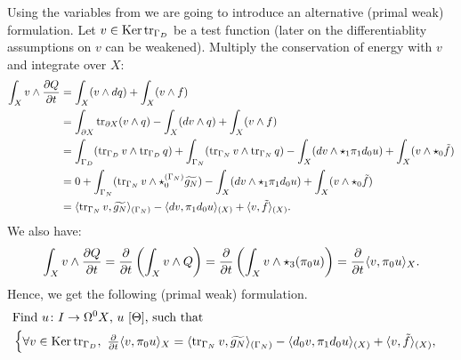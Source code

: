 \begin{discussion}
  Using the variables from
  we are going to introduce an alternative (primal weak) formulation.
  Let $v \in \mathop{\rm Ker}\nolimits \mathop{\rm tr}\nolimits_{\Gamma_D}$ be a test function
  (later on the differentiablity assumptions on $v$ can be weakened).
  Multiply the conservation of energy with $v$ and integrate over $X$:
  \begin{equation}
    \begin{split}
      \int_X v \wedge \frac{\partial Q}{\partial t}
      & = \int_X (v \wedge d q) + \int_X (v \wedge f) \\
      & = \int_{\partial X} \mathop{\rm tr}\nolimits_{\partial X} (v \wedge q)
        - \int_X (d v \wedge q)
        + \int_X (v \wedge f) \\
      & = \int_{\Gamma_D} (\mathop{\rm tr}\nolimits_{\Gamma_D} v \wedge \mathop{\rm tr}\nolimits_{\Gamma_D} q)
        + \int_{\Gamma_N} (\mathop{\rm tr}\nolimits_{\Gamma_N} v \wedge \mathop{\rm tr}\nolimits_{\Gamma_N} q)
        - \int_X (d v \wedge \star_1 \pi_1 d_0 u)
        + \int_X (v \wedge \star_0 \tilde{f}) \\
      & = 0
        + \int_{\Gamma_N}
          (\mathop{\rm tr}\nolimits_{\Gamma_N} v \wedge \star^{(\Gamma_N)}_0 \widetilde{g_N})
        - \int_X (d v \wedge \star_1 \pi_1 d_0 u)
        + \int_X (v \wedge \star_0 \tilde{f}) \\
      & = \langle\mathop{\rm tr}\nolimits_{\Gamma_N} v,\widetilde{g_N}\rangle_{(\Gamma_N)}
        - \langle d v,\pi_1 d_0 u\rangle_{(X)}
        + \langle v,\tilde{f}\rangle_{(X)}.
    \end{split}
  \end{equation}
  We also have:
  \begin{equation}
    \int_X v \wedge \frac{\partial Q}{\partial t}
    = \frac{\partial}{\partial t} \left(\int_X v \wedge Q\right)
    = \frac{\partial}{\partial t}
      \left(\int_X v \wedge \star_3 (\pi_0 u)\right)
    = \frac{\partial}{\partial t} \langle v,\pi_0 u\rangle_X.
  \end{equation}
  Hence, we get the following (primal weak) formulation.
  \begin{equation}
    \begin{split}
      & \text{Find $u \colon I \to \Omega^0 X$, $u\ [\Theta]$, such that} \\
      &
      \begin{cases}
        \forall v \in \mathop{\rm Ker}\nolimits \mathop{\rm tr}\nolimits_{\Gamma_D},\
          \frac{\partial}{\partial t} \langle v,\pi_0 u\rangle_X
          = \langle\mathop{\rm tr}\nolimits_{\Gamma_N} v,\widetilde{g_N}\rangle_{(\Gamma_N)}
          - \langle d_0 v,\pi_1 d_0 u\rangle_{(X)}
          + \langle v,\tilde{f}\rangle_{(X)}, \\

\end{cases}
\end{split}
\end{equation}
\end{discussion}
